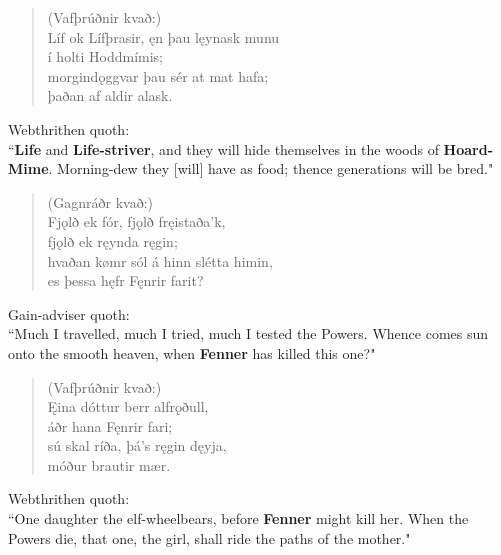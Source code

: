 \begin{verse}
(Vafþrúðnir kvað:) \\%
\bva Líf ok Lífþrasir, \hld ęn þau lęynask munu \\%
\ind í holti Hoddmímis; \\%
morgindǫggvar \hld þau sér at mat hafa; \\%
\ind þaðan af aldir alask.\\%
\end{verse}

\bvb Webthrithen quoth: \\ “\textbf{Life} and \textbf{Life-striver}, and they will hide themselves in the woods of \textbf{Hoard-Mime}\footnotemark[85]. Morning-dew they [will] have as food; thence generations will be bred." \\

\begin{verse}
(Gagnráðr kvað:) \\%
\bva Fjǫlð ek fór, \hld fjǫlð fręistaða'k, \\%
\ind fjǫlð ek ręynda ręgin; \\%
hvaðan kømr sól \hld á hinn slétta himin, \\%
\ind es þessa hęfr Fęnrir farit?\\%
\end{verse}

\bvb Gain-adviser quoth: \\ “Much I travelled, much I tried, much I tested the Powers. Whence comes sun onto the smooth heaven, when \textbf{Fenner} has killed this one\footnotemark[90]?" \\

\begin{verse}
(Vafþrúðnir kvað:) \\%
\bva Ęina dóttur \hld berr alfrǫðull, \\%
\ind áðr hana Fęnrir fari; \\%
sú skal ríða, \hld þá's ręgin dęyja, \\%
\ind móður brautir mær.\\%
\end{verse}

\bvb Webthrithen quoth: \\ “One daughter the elf-wheel\footnotemark[95] bears, before \textbf{Fenner} might kill her. When the Powers die, that one, the girl, shall ride the paths of the mother." \\

